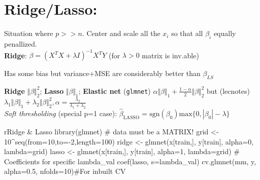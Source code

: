 \section*{Ridge/Lasso:} 
Situation where $p>>n$. Center and scale all the $x_i$ so that all $\beta_i$ equally penallized.\\
\textbf{Ridge}: $\beta=(X^TX+\lambda I)^{-1}X^TY$ (for $\lambda>0$ matrix is inv.able)

Has some bias but variance+MSE are considerably better than $\beta_{LS}$

\textbf{Ridge} $\Vert\beta\Vert_2^2$; \textbf{Lasso} $\Vert\beta\Vert_1$;
\textbf{Elastic net} (\texttt{glmnet})  $\alpha\Vert\beta\Vert_1+\frac{1-\alpha}{2}\Vert\beta\Vert_2^2$ but (lecnotes)  $\lambda_1\Vert\beta\Vert_1+\lambda_2 \Vert\beta\Vert_2^2,  \alpha=\frac{\lambda_2}{\lambda_1+\lambda_2}$\\
\textit{Soft thresholding} (special p=1 case): $\hat{\beta}_{\text{LASSO}} = \text{sgn}(\beta_0) \text{max}\{0, |\beta_0| - \lambda\}$
\begin{codebox}{r}{Ridge \& Lasso}
library(glmnet) # data must be a MATRIX!
grid <- 10^seq(from=10,to=-2,length=100)
ridge <- glmnet(x[train,], y[train], alpha=0, lambda=grid)
lasso <- glmnet(x[train,], y[train], alpha=1, lambda=grid)
# Coefficients for specific lambda_val
coef(lasso, s=lambda_val)
cv.glmnet(mm, y, alpha=0.5, nfolds=10)#For inbuilt CV
\end{codebox}
